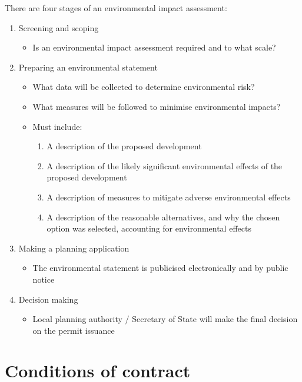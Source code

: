 There are four stages of an environmental impact assessment:
\begin{enumerate}
    \item Screening and scoping
          \begin{itemize}
              \item Is an environmental impact assessment required and to what scale?
          \end{itemize}
    \item Preparing an environmental statement
          \begin{itemize}
              \item What data will be collected to determine environmental risk?
              \item What measures will be followed to minimise environmental impacts?
              \item Must include:
                    \begin{enumerate}
                        \item A description of the proposed development
                        \item A description of the likely significant environmental effects of the proposed development
                        \item A description of measures to mitigate adverse environmental effects
                        \item A description of the reasonable alternatives, and why the chosen option was selected, accounting for environmental effects
                    \end{enumerate}
          \end{itemize}
    \item Making a planning application
          \begin{itemize}
              \item The environmental statement is publicised electronically and by public notice
          \end{itemize}
    \item Decision making
          \begin{itemize}
              \item Local planning authority / Secretary of State will make the final decision on the permit issuance
          \end{itemize}
\end{enumerate}
\section{Conditions of contract}
